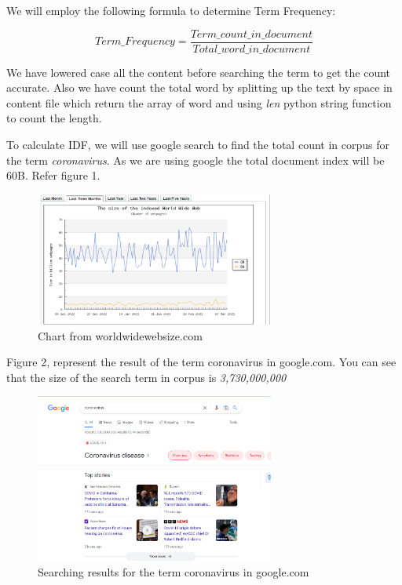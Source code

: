 \documentclass[12pt]{article}
\begin{document}
We will employ the following formula to determine Term Frequency:

\begin{equation}\label{eq1}
Term\_Frequency = \frac{Term\_count\_in\_document}{Total\_word\_in\_document}
\end{equation}

We have lowered case all the content before searching the term to get the count accurate. Also we have count the total word by splitting up the text by space in content file which return the array of word and using \textit{len} python string function to count the length.

To calculate IDF, we will use google search to find the total count in corpus for the term \textit{coronavirus}. As we are using google the total document index will be 60B. Refer figure 1.

\begin{figure}[h]
\caption{Chart from worldwidewebsize.com}
\centering
\includegraphics[width=0.70\textwidth]{wwwsize.png}
\end{figure}

Figure 2, represent the result of the term coronavirus in google.com. You can see that the size of the search term in corpus is \textit{3,730,000,000}

\begin{figure}[h]
\caption{Searching results for the term coronavirus in google.com}
\centering
\includegraphics[width=0.70\textwidth]{googlecorpus.png}
\end{figure}
\end{document}
